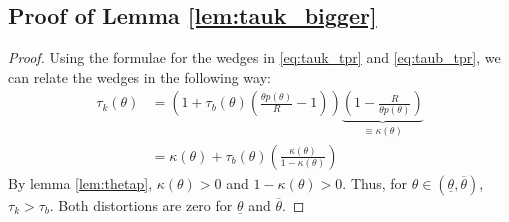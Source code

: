 \documentclass[11pt]{article}
\begin{document}
\subsection*{Proof of Lemma \ref{lem:tauk_bigger}}
\begin{proof}
    Using the formulae for the wedges in \eqref{eq:tauk_tpr} and \eqref{eq:taub_tpr}, we can relate the wedges in the following way: 
    \begin{align*}
        \tau_{k}\left(\theta\right)&=\left(1+\tau_{b}\left(\theta\right)\left(\frac{\theta p\left(\theta\right)}{R}-1\right)\right)\underbrace{\left(1-\frac{R}{\theta p\left(\theta\right)}\right)}_{\equiv\kappa\left(\theta\right)}\\&=\kappa\left(\theta\right)+\tau_{b}\left(\theta\right)\left(\frac{\kappa\left(\theta\right)}{1-\kappa\left(\theta\right)}\right)
    \end{align*}
    By lemma \ref{lem:thetap}, \( \kappa(\theta)>0 \) and \( 1-\kappa(\theta)>0 \). Thus, for \( \theta\in\left(\underline{\theta},\overline{\theta}\right) \), \( \tau_{k}>\tau_{b} \). Both distortions are zero for \( \underline{\theta} \) and \( \overline{\theta} \). 
\end{proof}
\end{document}
